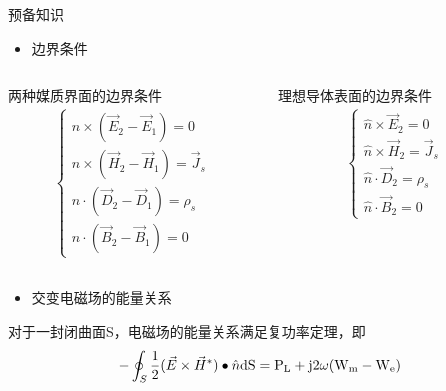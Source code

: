 \begin{frame}{预备知识}
    \begin{itemize}
        \item 边界条件
    \end{itemize}
    \begin{columns}
        \begin{column}{0.5\linewidth}
            两种媒质界面的边界条件
            \begin{align*}
                \begin{cases}
                    \hat{n}\times(\vec{E}_2-\vec{E}_1)=0         \\
                    \hat{n}\times(\vec{H}_2-\vec{H}_1)=\vec{J}_s \\
                    \hat{n}\cdot(\vec{D}_2-\vec{D}_1)=\rho_s     \\
                    \hat{n}\cdot(\vec{B}_2-\vec{B}_1)=0
                \end{cases}
            \end{align*}
        \end{column}
        \begin{column}{0.5\linewidth}
            理想导体表面的边界条件
            \begin{align*}
                \begin{cases}
                    \hat{n}\times\vec{E}_2=0         \\
                    \hat{n}\times\vec{H}_2=\vec{J}_s \\
                    \hat{n}\cdot\vec{D}_2=\rho_s     \\
                    \hat{n}\cdot\vec{B}_2=0
                \end{cases}
            \end{align*}
        \end{column}
    \end{columns}
\end{frame}

\begin{frame}
    \begin{itemize}
        \item 交变电磁场的能量关系
    \end{itemize}
    对于一封闭曲面S，电磁场的能量关系满足复功率定理，即
    \begin{align*}
        -\oint_S\frac{1}{2}(\vec{E}\times\vec{H}^*)\bullet\hat{n}\rm{d}S=P_L+\rm{j}2\omega(W_m-W_e)
    \end{align*}
\end{frame}

